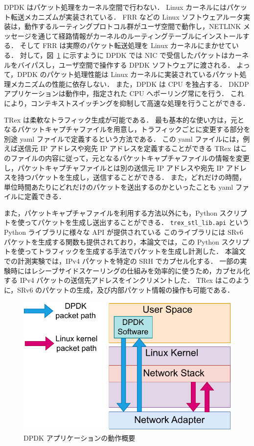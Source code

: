 DPDK はパケット処理をカーネル空間で行わない．
Linux カーネルにはパケット転送メカニズムが実装されている．
FRR などの Linux ソフトウェアルータ実装は，動作するルーティングプロトコル群がユーザ空間で動作し，NETLINK メッセージを通じて経路情報がカーネルのルーティングテーブルにインストールする．
そして FRR は実際のパケット転送処理を Linux カーネルにまかせている．
対して，図~\ref*{fig:dpdk} に示すように DPDK では NIC で受信したパケットはカーネルをバイパスし，ユーザ空間で操作する DPDK ソフトウェアに渡される．
よって，DPDK のパケット処理性能は Linux カーネルに実装されているパケット処理メカニズムの性能に依存しない．
また，DPDK は CPU を独占する．
DKDP アプリケーションは動作中，指定された CPU へポーリング常にを行う．
これにより，コンテキストスイッチングを抑制して高速な処理を行うことができる．

TRex は柔軟なトラフィック生成が可能である．
最も基本的な使い方は，元となるパケットキャプチャファイルを用意し，トラフィックごとに変更する部分を別途 yaml ファイルで定義するという方法である．
この yaml ファイルには，例えば送信元 IP アドレスや宛先 IP アドレスを定義することができる
TRex はこのファイルの内容に従って，元となるパケットキャプチャファイルの情報を変更し，パケットキャプチャファイルとは別の送信元 IP アドレスや宛先 IP アドレスを持つパケットを生成し，送信することができる．
また，どれだけの時間，単位時間あたりにどれだけのパケットを送出するのかといったことも yaml ファイルに定義できる．

また，パケットキャプチャファイルを利用する方法以外にも，Python スクリプトを使ってパケットを生成し送出することができる．
\texttt{trex\_stl\_lib.api} という Python ライブラリに様々な API が提供されている
このライブラリには SRv6 パケットを生成する関数も提供されており，本論文では，この Python スクリプトを使ってトラフィックを生成する手法でパケットを生成し計測した．
本論文での計測実験では，IPv4 パケットを特定の SRH でカプセル化する．
一部の実験時にはレシーブサイドスケーリングの仕組みを効率的に使うため，カプセル化する IPv4 パケットの送信先アドレスをインクリメントした．
TRex はこのように，SRv6 のパケットの生成，及び内部パケット情報の操作も可能である．

\begin{figure}[t]
    \centering
    \includegraphics[width=0.95\linewidth]{img/DPDK.pdf}
    \caption{DPDK アプリケーションの動作概要}
    \label{fig:dpdk}
\end{figure}

